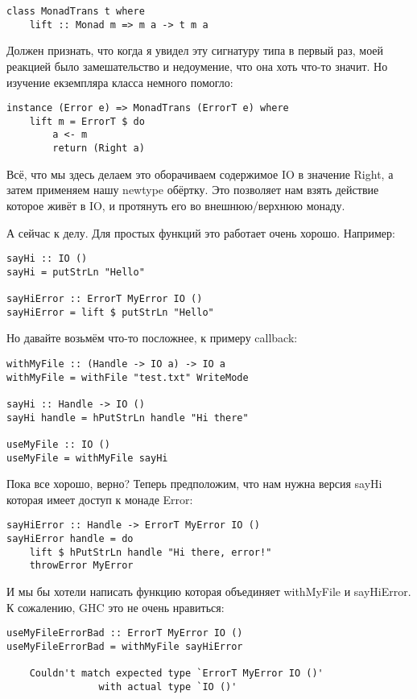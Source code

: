 \begin{lstlisting}
class MonadTrans t where
    lift :: Monad m => m a -> t m a
\end{lstlisting}

Должен признать, что когда я увидел эту сигнатуру типа в первый раз, моей реакцией было замешательство и недоумение, что она хоть что-то значит. Но изучение екземпляра класса немного помогло:

\begin{lstlisting}
instance (Error e) => MonadTrans (ErrorT e) where
    lift m = ErrorT $ do
        a <- m
        return (Right a)
\end{lstlisting}

Всё, что мы здесь делаем это оборачиваем содержимое IO в значение Right, а затем применяем нашу newtype обёртку. Это позволяет нам взять действие которое живёт в IO, и протянуть его во внешнюю/верхнюю монаду.

А сейчас к делу. Для простых функций это работает очень хорошо. Например:

\begin{lstlisting}
sayHi :: IO ()
sayHi = putStrLn "Hello"

sayHiError :: ErrorT MyError IO ()
sayHiError = lift $ putStrLn "Hello"
\end{lstlisting}

Но давайте возьмём что-то посложнее, к примеру callback:

\begin{lstlisting}
withMyFile :: (Handle -> IO a) -> IO a
withMyFile = withFile "test.txt" WriteMode

sayHi :: Handle -> IO ()
sayHi handle = hPutStrLn handle "Hi there"

useMyFile :: IO ()
useMyFile = withMyFile sayHi
\end{lstlisting}

Пока все хорошо, верно? Теперь предположим, что нам нужна версия sayHi которая имеет доступ к монаде Error:

\begin{lstlisting}
sayHiError :: Handle -> ErrorT MyError IO ()
sayHiError handle = do
    lift $ hPutStrLn handle "Hi there, error!"
    throwError MyError
\end{lstlisting}

И мы бы хотели написать функцию которая объединяет withMyFile и sayHiError. К сожалению, GHC это не очень нравиться:

\begin{lstlisting}
useMyFileErrorBad :: ErrorT MyError IO ()
useMyFileErrorBad = withMyFile sayHiError

    Couldn't match expected type `ErrorT MyError IO ()'
                with actual type `IO ()'
\end{lstlisting}

